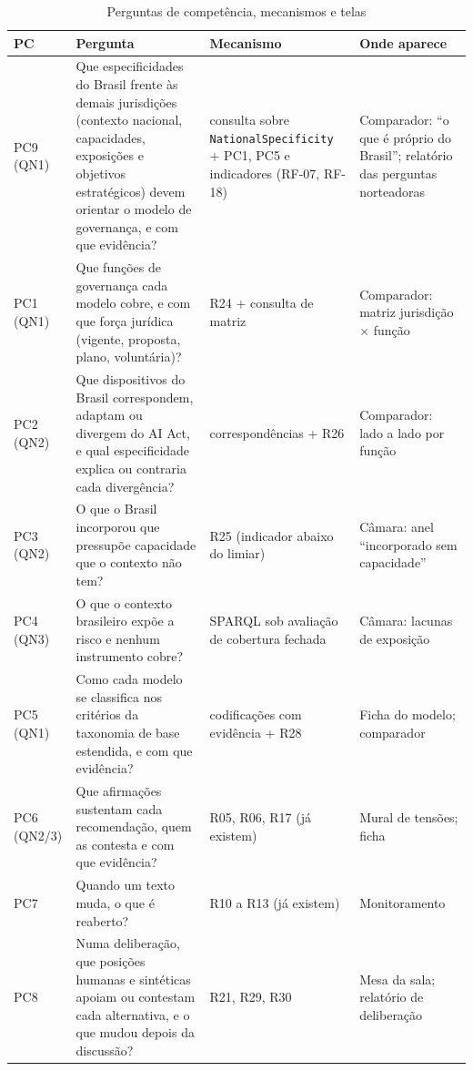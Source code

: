 \documentclass[12pt,a4paper,oneside,english,brazil]{abntex2}
\begin{document}
\begin{table}[htbp]
\caption{Perguntas de competência, mecanismos e telas}\label{tab:pcs}
\centering\small
\begin{tabularx}{\linewidth}{l L L L}
\toprule
PC & Pergunta & Mecanismo & Onde aparece\\
\midrule
PC9 (QN1) & Que especificidades do Brasil frente às demais jurisdições (contexto nacional, capacidades, exposições e objetivos estratégicos) devem orientar o modelo de governança, e com que evidência? & consulta sobre \texttt{NationalSpecificity} + PC1, PC5 e indicadores (RF-07, RF-18) & Comparador: ``o que é próprio do Brasil''; relatório das perguntas norteadoras\\
PC1 (QN1) & Que funções de governança cada modelo cobre, e com que força jurídica (vigente, proposta, plano, voluntária)? & R24 + consulta de matriz & Comparador: matriz jurisdição $\times$ função\\
PC2 (QN2) & Que dispositivos do Brasil correspondem, adaptam ou divergem do AI Act, e qual especificidade explica ou contraria cada divergência? & correspondências + R26 & Comparador: lado a lado por função\\
PC3 (QN2) & O que o Brasil incorporou que pressupõe capacidade que o contexto não tem? & R25 (indicador abaixo do limiar) & Câmara: anel ``incorporado sem capacidade''\\
PC4 (QN3) & O que o contexto brasileiro expõe a risco e nenhum instrumento cobre? & SPARQL sob avaliação de cobertura fechada & Câmara: lacunas de exposição\\
PC5 (QN1) & Como cada modelo se classifica nos critérios da taxonomia de base estendida, e com que evidência? & codificações com evidência + R28 & Ficha do modelo; comparador\\
PC6 (QN2/3) & Que afirmações sustentam cada recomendação, quem as contesta e com que evidência? & R05, R06, R17 (já existem) & Mural de tensões; ficha\\
PC7 & Quando um texto muda, o que é reaberto? & R10 a R13 (já existem) & Monitoramento\\
PC8 & Numa deliberação, que posições humanas e sintéticas apoiam ou contestam cada alternativa, e o que mudou depois da discussão? & R21, R29, R30 & Mesa da sala; relatório de deliberação\\
\bottomrule
\end{tabularx}
\end{table}
\end{document}
